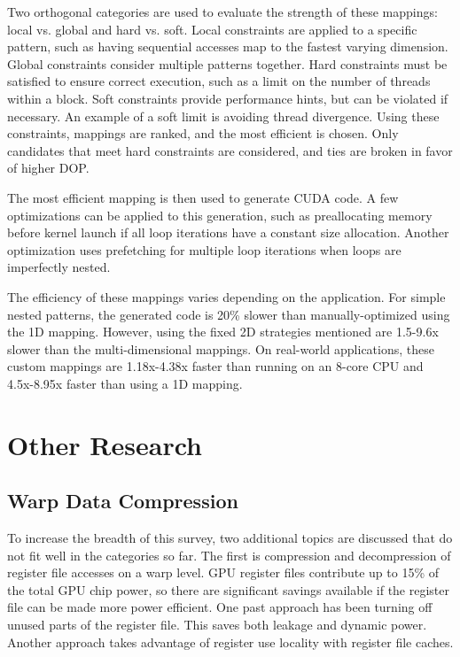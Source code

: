 \documentclass[prodmode,acmtecs]{acmsmall} %
\begin{document}
Two orthogonal categories are used to evaluate the strength of these mappings:
local vs. global and hard vs. soft. Local constraints are applied to a specific
pattern, such as having sequential accesses map to the fastest varying
dimension. Global constraints consider multiple patterns together. Hard
constraints must be satisfied to ensure correct execution, such as a limit on
the number of threads within a block. Soft constraints provide performance
hints, but can be violated if necessary. An example of a soft limit is avoiding
thread divergence. Using these constraints, mappings are ranked, and the most
efficient is chosen. Only candidates that meet hard constraints are considered,
and ties are broken in favor of higher DOP.

The most efficient mapping is then used to generate CUDA code. A few
optimizations can be applied to this generation, such as preallocating memory
before kernel launch if all loop iterations have a constant size allocation.
Another optimization uses prefetching for multiple loop iterations when loops
are imperfectly nested.

The efficiency of these mappings varies depending on the application. For simple
nested patterns, the generated code is 20\% slower than manually-optimized using
the 1D mapping. However, using the fixed 2D strategies mentioned are 1.5-9.6x
slower than the multi-dimensional mappings. On real-world applications, these
custom mappings are 1.18x-4.38x faster than running on an 8-core CPU and
4.5x-8.95x faster than using a 1D mapping.

\section{Other Research} \label{sec:memory}
\subsection{Warp Data Compression}
To increase the breadth of this survey, two additional topics are discussed that
do not fit well in the categories so far. The first is compression and
decompression of register file accesses on a warp level. GPU register files
contribute up to 15\% of the total GPU chip power, so there are significant
savings available if the register file can be made more power efficient. One
past approach has been turning off unused parts of the register file. This saves
both leakage and dynamic power. Another approach takes advantage of register use
locality with register file caches.
\end{document}
